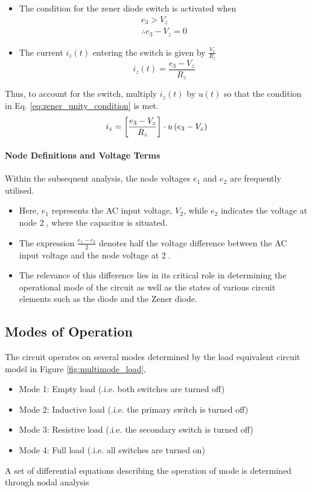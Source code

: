 \begin{itemize}
	\item The condition for the zener diode switch is activated when \begin{equation}
		\begin{split}
			e_3 > V_z \\
			\therefore e_3 - V_z = 0
			\label{eq:zener_unity_condition}
		\end{split}
	\end{equation}
	\item The current $i_z(t)$ entering the switch is given by $\frac{V_z}{R_z}$
	\begin{equation}
		i_z(t) = \frac{e_3 - V_z}{R_z}
	\end{equation}
\end{itemize}
Thus, to account for the switch, multiply $i_z(t)$ by $u(t)$ so that the condition in Eq. \ref{eq:zener_unity_condition} is met.
\begin{equation}
    i_z = \left[\frac{e_3 - V_z}{R_z} \right]\cdot u\left(e_3 - V_z \right)
    \label{eq:zener_current}
\end{equation}

\paragraph{Node Definitions and Voltage Terms}
Within the subsequent analysis, the node voltages $e_1$ and $e_2$ are frequently utilised.
\begin{itemize}
	\item Here, $e_1$ represents the AC input voltage, $V_2$, while $e_2$ indicates the voltage at node \textcircled{2}, where the capacitor is situated.
	\item The expression $\frac{e_1 - e_2}{2}$ denotes half the voltage difference between the AC input voltage and the node voltage at \textcircled{2}.
	\item The relevance of this difference lies in its critical role in determining the operational mode of the circuit as well as the states of various circuit elements such as the diode and the Zener diode.
\end{itemize}

\pagebreak
\subsection{Modes of Operation}
The circuit operates on several modes determined by the load equivalent circuit model in Figure \ref{fig:multimode_load},
\begin{itemize}
	\item Mode 1: Empty load (.i.e. both switches are turned off)
	\item Mode 2: Inductive load (.i.e. the primary switch is turned off)
	\item Mode 3: Resistive load (.i.e. the secondary switch is turned off) 
	\item Mode 4: Full load (.i.e. all switches are turned on)
\end{itemize}
A set of differential equations describing the operation of mode is determined through nodal analysis

